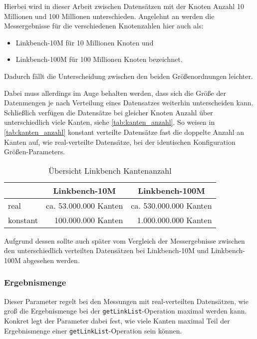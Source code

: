Hierbei wird in dieser Arbeit zwischen Datensätzen mit der Knoten Anzahl 10 Millionen und 100 Millionen unterschieden. Angelehnt an \cite{sigmod_tian} werden die Messergebnisse für die verschiedenen Knotenzahlen hier auch als:
\begin{itemize}
    \item Linkbench-10M für 10 Millionen Knoten und 
    \item Linkbench-100M für 100 Millionen Knoten bezeichnet.
\end{itemize}
Dadurch fällt die Unterscheidung zwischen den beiden Größenordnungen leichter. 

Dabei muss allerdings im Auge behalten werden, dass sich die Größe der Datenmengen je nach Verteilung eines Datensatzes weiterhin unterscheiden kann. Schließlich verfügen die Datensätze bei gleicher Knoten Anzahl über unterschiedlich viele Kanten, siehe \autoref{tab:kanten_anzahl}. So weisen in \autoref{tab:kanten_anzahl} konstant verteilte Datensätze fast die doppelte Anzahl an Kanten auf, wie real-verteilte Datensätze, bei der identischen Konfiguration Größen-Parameters. 

\begin{table}[ht]
    \centering
    \begin{tabular}{l|r|r}
    \hline
    \rowcolor[HTML]{EFEFEF} 
    \multicolumn{1}{c|}{\cellcolor[HTML]{EFEFEF}\textbf{Verteilung}} & \multicolumn{1}{c|}{\cellcolor[HTML]{EFEFEF}\textbf{Linkbench-10M}} & \multicolumn{1}{c}{\cellcolor[HTML]{EFEFEF}\textbf{Linkbench-100M}} \\ \hline
    real & ca. 53.000.000 Kanten & ca. 530.000.000 Kanten \\
    konstant & 100.000.000 Kanten & 1.000.000.000 Kanten \\ \hline
    \end{tabular}
    \caption{Übersicht Linkbench Kantenanzahl}
    \label{tab:kanten_anzahl}
    \vspace{1em}
    \textit{}
\end{table}

Aufgrund dessen sollte auch später vom Vergleich der Messergebnisse zwischen den unterschiedlich verteilten Datensätzen bei Linkbench-10M und Linkbench-100M abgesehen werden.

\subsubsection{Ergebnismenge}
Dieser Parameter regelt bei den Messungen mit real-verteilten Datensätzen, wie groß die Ergebnismenge bei der \texttt{getLinkList}-Operation maximal werden kann. Konkret legt der Parameter dabei fest, wie viele Kanten maximal Teil der Ergebnismenge einer \texttt{getLinkList}-Operation sein können.

